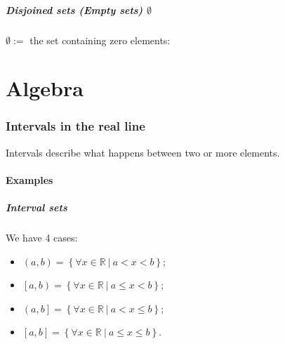 \documentclass{article}
\newcommand{\figbox}[1]{ 
    \begin{figure*}[ht!]        
        \begin{center}            
            \fbox{#1}        
        \end{center}    
    \end{figure*}
}
\newcommand{\sht}{\ |\ }
\begin{document}
\newpage
\subsubsection{Disjoined sets (Empty sets) $\emptyset$}
$\emptyset :=$ the set containing zero elements:
\figbox{$A \cap B = \emptyset$}

\begin{figure}[ht!]
    \begin{center}
    \end{center}
\end{figure}

\newpage
\part{Algebra}
\section{Intervals in the real line}
Intervals describe what happens between two or more elements.

\subsection{Examples}
\subsubsection{Interval sets}
We have 4 cases:
\begin{itemize}
    \item $(a,b) = \left\{\forall x \in \mathbb{R} \sht a<x<b\right\}$;
    \item $\left[a,b\right) = \left\{\forall x \in \mathbb{R} \sht a\leq x<b\right\}$;
    \item $\left(a,b\right] = \left\{\forall x \in \mathbb{R} \sht a<x\leq b\right\}$;
    \item $\left[a,b\right] = \left\{\forall x \in \mathbb{R} \sht a\leq x\leq b\right\}$.
\end{itemize}
\end{document}
